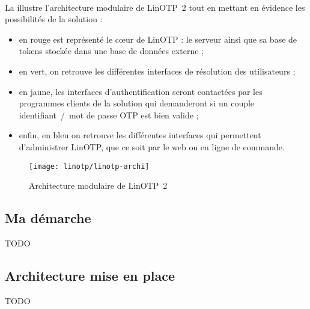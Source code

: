 \paragraph{}
La  illustre l'architecture modulaire de LinOTP~2 tout en mettant en évidence les possibilités de la solution :

\begin{itemize}
	\item en rouge est représenté le c\oe ur de LinOTP : le serveur ainsi que sa base de tokens stockée dans une base de données externe ;
	\item en vert, on retrouve les différentes interfaces de résolution des utilisateurs ;
	\item en jaune, les interfaces d'authentification seront contactées par les programmes clients de la solution qui demanderont si un couple identifiant~/~mot de passe OTP est bien valide ;
	\item enfin, en bleu on retrouve les différentes interfaces qui permettent d'administrer LinOTP, que ce soit par le web ou en ligne de commande.
\end{itemize}

\begin{figure}
	\centering
	\texttt{[image: linotp/linotp-archi]}
	\caption{Architecture modulaire de LinOTP~2}
	\label{figure:linotp:linotp-archi}
\end{figure}


\subsection{Ma démarche}

TODO


\subsection{Architecture mise en place}

TODO

